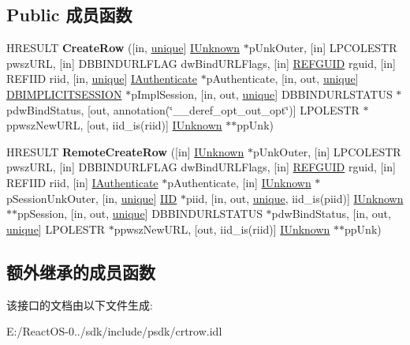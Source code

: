 \subsection*{Public 成员函数}
\begin{DoxyCompactItemize}
\item 
\mbox{\label{interface_i_create_row_abf047bdf159f27238c72e0799c32be4b}} 
H\+R\+E\+S\+U\+LT {\bfseries Create\+Row} (\mbox{[}in, \hyperlink{interfaceunique}{unique}\mbox{]} \hyperlink{interface_i_unknown}{I\+Unknown} $\ast$p\+Unk\+Outer, \mbox{[}in\mbox{]} L\+P\+C\+O\+L\+E\+S\+TR pwsz\+U\+RL, \mbox{[}in\mbox{]} D\+B\+B\+I\+N\+D\+U\+R\+L\+F\+L\+AG dw\+Bind\+U\+R\+L\+Flags, \mbox{[}in\mbox{]} \hyperlink{struct___g_u_i_d}{R\+E\+F\+G\+U\+ID} rguid, \mbox{[}in\mbox{]} R\+E\+F\+I\+ID riid, \mbox{[}in, \hyperlink{interfaceunique}{unique}\mbox{]} \hyperlink{interface_i_authenticate}{I\+Authenticate} $\ast$p\+Authenticate, \mbox{[}in, out, \hyperlink{interfaceunique}{unique}\mbox{]} \hyperlink{structtag_d_b_i_m_p_l_i_c_i_t_s_e_s_s_i_o_n}{D\+B\+I\+M\+P\+L\+I\+C\+I\+T\+S\+E\+S\+S\+I\+ON} $\ast$p\+Impl\+Session, \mbox{[}in, out, \hyperlink{interfaceunique}{unique}\mbox{]} D\+B\+B\+I\+N\+D\+U\+R\+L\+S\+T\+A\+T\+US $\ast$pdw\+Bind\+Status, \mbox{[}out, annotation(\char`\"{}\+\_\+\+\_\+deref\+\_\+opt\+\_\+out\+\_\+opt\char`\"{})\mbox{]} L\+P\+O\+L\+E\+S\+TR $\ast$ppwsz\+New\+U\+RL, \mbox{[}out, iid\+\_\+is(riid)\mbox{]} \hyperlink{interface_i_unknown}{I\+Unknown} $\ast$$\ast$pp\+Unk)
\item 
\mbox{\label{interface_i_create_row_a49e81d731862fb0c1bd18a1ad57a18a6}} 
H\+R\+E\+S\+U\+LT {\bfseries Remote\+Create\+Row} (\mbox{[}in\mbox{]} \hyperlink{interface_i_unknown}{I\+Unknown} $\ast$p\+Unk\+Outer, \mbox{[}in\mbox{]} L\+P\+C\+O\+L\+E\+S\+TR pwsz\+U\+RL, \mbox{[}in\mbox{]} D\+B\+B\+I\+N\+D\+U\+R\+L\+F\+L\+AG dw\+Bind\+U\+R\+L\+Flags, \mbox{[}in\mbox{]} \hyperlink{struct___g_u_i_d}{R\+E\+F\+G\+U\+ID} rguid, \mbox{[}in\mbox{]} R\+E\+F\+I\+ID riid, \mbox{[}in\mbox{]} \hyperlink{interface_i_authenticate}{I\+Authenticate} $\ast$p\+Authenticate, \mbox{[}in\mbox{]} \hyperlink{interface_i_unknown}{I\+Unknown} $\ast$p\+Session\+Unk\+Outer, \mbox{[}in, \hyperlink{interfaceunique}{unique}\mbox{]} \hyperlink{struct___i_i_d}{I\+ID} $\ast$piid, \mbox{[}in, out, \hyperlink{interfaceunique}{unique}, iid\+\_\+is(piid)\mbox{]} \hyperlink{interface_i_unknown}{I\+Unknown} $\ast$$\ast$pp\+Session, \mbox{[}in, out, \hyperlink{interfaceunique}{unique}\mbox{]} D\+B\+B\+I\+N\+D\+U\+R\+L\+S\+T\+A\+T\+US $\ast$pdw\+Bind\+Status, \mbox{[}in, out, \hyperlink{interfaceunique}{unique}\mbox{]} L\+P\+O\+L\+E\+S\+TR $\ast$ppwsz\+New\+U\+RL, \mbox{[}out, iid\+\_\+is(riid)\mbox{]} \hyperlink{interface_i_unknown}{I\+Unknown} $\ast$$\ast$pp\+Unk)
\end{DoxyCompactItemize}
\subsection*{额外继承的成员函数}


该接口的文档由以下文件生成\+:\begin{DoxyCompactItemize}
\item 
E\+:/\+React\+O\+S-\/0../sdk/include/psdk/crtrow.\+idl\end{DoxyCompactItemize}
